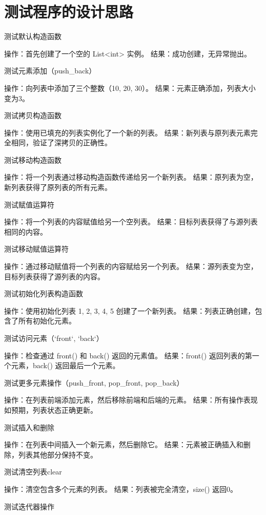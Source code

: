 \documentclass[UTF8]{ctexart}
\begin{document}
\pagestyle{fancy}
\fancyhead{}

\section{测试程序的设计思路}

测试默认构造函数

操作：首先创建了一个空的 List<int> 实例。
结果：成功创建，无异常抛出。

测试元素添加（push_back）

操作：向列表中添加了三个整数（10, 20, 30）。
结果：元素正确添加，列表大小变为3。

测试拷贝构造函数

操作：使用已填充的列表实例化了一个新的列表。
结果：新列表与原列表元素完全相同，验证了深拷贝的正确性。

测试移动构造函数

操作：将一个列表通过移动构造函数传递给另一个新列表。
结果：原列表为空，新列表获得了原列表的所有元素。

测试赋值运算符

操作：将一个列表的内容赋值给另一个空列表。
结果：目标列表获得了与源列表相同的内容。

测试移动赋值运算符

操作：通过移动赋值将一个列表的内容赋给另一个列表。
结果：源列表变为空，目标列表获得了源列表的内容。

测试初始化列表构造函数

操作：使用初始化列表 {1, 2, 3, 4, 5} 创建了一个新列表。
结果：列表正确创建，包含了所有初始化元素。

测试访问元素（`front`, `back`）

操作：检查通过 front() 和 back() 返回的元素值。
结果：front() 返回列表的第一个元素，back() 返回最后一个元素。

测试更多元素操作（push_front, pop_front, pop_back）

操作：在列表前端添加元素，然后移除前端和后端的元素。
结果：所有操作表现如预期，列表状态正确更新。

测试插入和删除

操作：在列表中间插入一个新元素，然后删除它。
结果：元素被正确插入和删除，列表其他部分保持不变。

测试清空列表clear

操作：清空包含多个元素的列表。
结果：列表被完全清空，size() 返回0。

测试迭代器操作
\end{document}
